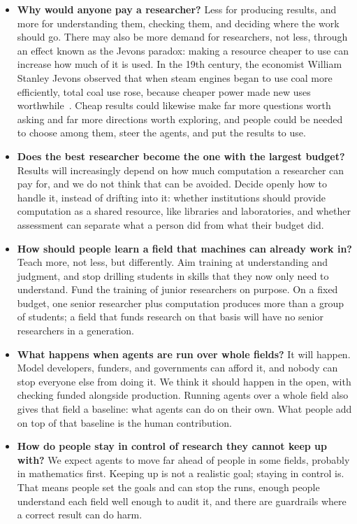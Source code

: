 \documentclass[11pt]{article}
\begin{document}
\begin{itemize}
  \item \textbf{Why would anyone pay a researcher?}
  Less for producing results, and more for understanding them, checking them, and deciding where the work should go.
  There may also be more demand for researchers, not less, through an effect known as the Jevons paradox: making a resource cheaper to use can increase how much of it is used.
  In the 19th century, the economist William Stanley Jevons observed that when steam engines began to use coal more efficiently, total coal use rose, because cheaper power made new uses worthwhile~\citep{jevons1865coal}.
  Cheap results could likewise make far more questions worth asking and far more directions worth exploring, and people could be needed to choose among them, steer the agents, and put the results to use.

  \item \textbf{Does the best researcher become the one with the largest budget?}
  Results will increasingly depend on how much computation a researcher can pay for, and we do not think that can be avoided.
  Decide openly how to handle it, instead of drifting into it: whether institutions should provide computation as a shared resource, like libraries and laboratories, and whether assessment can separate what a person did from what their budget did.

  \item \textbf{How should people learn a field that machines can already work in?}
  Teach more, not less, but differently.
  Aim training at understanding and judgment, and stop drilling students in skills that they now only need to understand.
  Fund the training of junior researchers on purpose.
  On a fixed budget, one senior researcher plus computation produces more than a group of students; a field that funds research on that basis will have no senior researchers in a generation.

  \item \textbf{What happens when agents are run over whole fields?}
  It will happen.
  Model developers, funders, and governments can afford it, and nobody can stop everyone else from doing it.
  We think it should happen in the open, with checking funded alongside production.
  Running agents over a whole field also gives that field a baseline: what agents can do on their own.
  What people add on top of that baseline is the human contribution.

  \item \textbf{How do people stay in control of research they cannot keep up with?}
  We expect agents to move far ahead of people in some fields, probably in mathematics first.
  Keeping up is not a realistic goal; staying in control is.
  That means people set the goals and can stop the runs, enough people understand each field well enough to audit it, and there are guardrails where a correct result can do harm.
\end{itemize}
\end{document}
